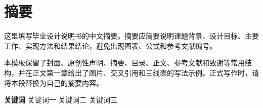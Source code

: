 \chapter{摘要}

这里填写毕业设计说明书的中文摘要。摘要应简要说明课题背景、设计目标、主要工作、实现方法和结果结论，避免出现图表、公式和参考文献编号。

本模板保留了封面、原创性声明、摘要、目录、正文、参考文献和致谢等常用结构，并在正文第一章给出了图片、交叉引用和三线表的写法示例。正式写作时，请将本段替换为自己的摘要内容。

{
    \vspace{1em}
    \setlength{\parindent}{0em}
    \textbf{关键词} \; 关键词一 \; 关键词二 \; 关键词三 \par
}
